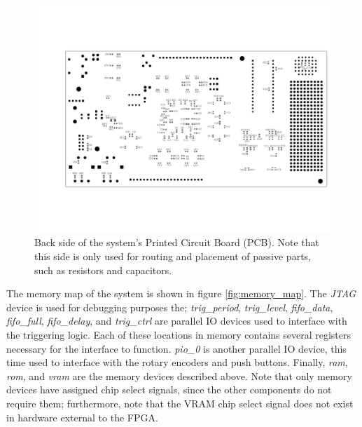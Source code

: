 \documentclass[titlepage]{scrartcl}
\begin{document}
	\begin{figure}[h!]
	\vspace{-2cm}
	\centerline{\includegraphics[width=28cm, angle=90, origin=c]{img/pcb_back.pdf}}
		\vspace{-2cm}
                	\caption{Back side of the system's Printed Circuit Board (PCB). Note that this side is only used for routing and placement of passive parts, such as resistors and capacitors.}
               	\label{fig:pcb_back}
	\end{figure}

	The memory map of the system is shown in figure \ref{fig:memory_map}. The \textit{JTAG} device is used for debugging purposes the; \textit{trig\_period}, \textit{trig\_level}, \textit{fifo\_data}, \textit{fifo\_full}, \textit{fifo\_delay}, and \textit{trig\_ctrl} are parallel IO devices used to interface with the triggering logic. Each of these locations in memory contains several registers necessary for the interface to function. \textit{pio\_0} is another parallel IO device, this time used to interface with the rotary encoders and push buttons. Finally, \textit{ram}, \textit{rom}, and \textit{vram} are the memory devices described above. Note that only memory devices have assigned chip select signals, since the other components do not require them; furthermore, note that the VRAM chip select signal does not exist in hardware external to the FPGA.
\end{document}
